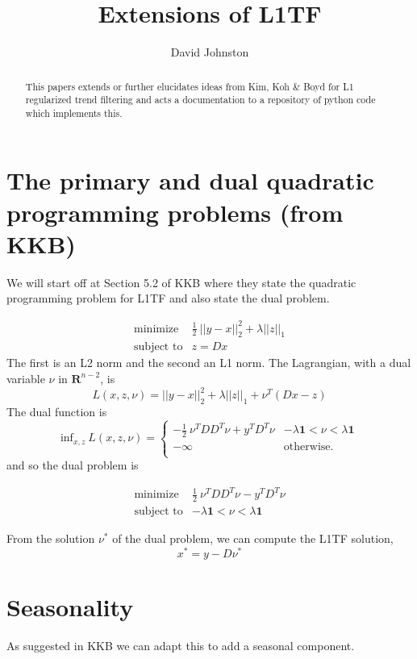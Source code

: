 \documentclass{article}
\begin{document}
\title{Extensions of L1TF}
\author{David Johnston}

\maketitle

\begin{abstract}
This papers extends or further elucidates ideas from Kim, Koh \& Boyd for L1 regularized
trend filtering and acts a documentation to a repository of python code which implements
this.
\end{abstract}

\section{The primary and dual quadratic programming problems (from KKB)}

We will start off at Section 5.2 of KKB where they state the quadratic programming problem for L1TF
and also state the dual problem.

\begin{eqnarray}
\mbox{minimize} & \frac{1}{2} ~ || y - x ||_2^2  + \lambda ||z||_1 \\
\mbox{subject to} & z = D x
\end{eqnarray}
The first is an L2 norm and the second an L1 norm. The Lagrangian, with a dual variable $\nu$ in $\mathbf{R}^{n-2}$, is
\[
L(x,z,\nu) =  || y - x ||_2^2  + \lambda ||z||_1 + \nu^T (D x -z)
\]
The dual function is
\[
\mbox{inf}_{x,z} ~ L(x,z,\nu) =
    \left\{
    \begin{array}{ll}
    - \frac{1}{2} ~ \nu^T D D^T \nu + y^T D^T \nu &  - \lambda \mathbf{1} < \nu < \lambda \mathbf{1} \\
  -\infty  & \mbox{otherwise.} \\
  \end{array}
  \right.
\]
and so the dual problem is

\begin{eqnarray}
\mbox{minimize} & \frac{1}{2} ~ \nu^T D D^T \nu - y^T D^T \nu \\
\mbox{subject to} & - \lambda \mathbf{1} < \nu < \lambda \mathbf{1}
\end{eqnarray}

From the solution $\nu^*$ of the dual problem, we can compute the L1TF solution,
\[
x^* = y - D \nu^*
\]


\section{Seasonality}

As suggested in KKB we can adapt this to add a seasonal component.
\end{document}
